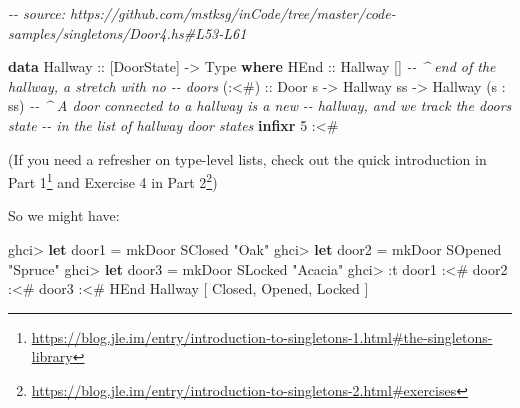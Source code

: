 \documentclass[]{article}
\newenvironment{Shaded}{}{}
\newcommand{\CommentTok}[1]{\textcolor[rgb]{0.38,0.63,0.69}{\textit{#1}}}
\newcommand{\DataTypeTok}[1]{\textcolor[rgb]{0.56,0.13,0.00}{#1}}
\newcommand{\DecValTok}[1]{\textcolor[rgb]{0.25,0.63,0.44}{#1}}
\newcommand{\KeywordTok}[1]{\textcolor[rgb]{0.00,0.44,0.13}{\textbf{#1}}}
\newcommand{\NormalTok}[1]{#1}
\newcommand{\OperatorTok}[1]{\textcolor[rgb]{0.40,0.40,0.40}{#1}}
\newcommand{\OtherTok}[1]{\textcolor[rgb]{0.00,0.44,0.13}{#1}}
\newcommand{\StringTok}[1]{\textcolor[rgb]{0.25,0.44,0.63}{#1}}
\renewcommand{\href}[2]{#2\footnote{\url{#1}}}
\begin{document}
\begin{Shaded}
\begin{Highlighting}[]
\CommentTok{{-}{-} source: https://github.com/mstksg/inCode/tree/master/code{-}samples/singletons/Door4.hs\#L53{-}L61}

\KeywordTok{data} \DataTypeTok{Hallway}\OtherTok{ ::}\NormalTok{ [}\DataTypeTok{DoorState}\NormalTok{] }\OtherTok{{-}\textgreater{}} \DataTypeTok{Type} \KeywordTok{where}
    \DataTypeTok{HEnd}\OtherTok{  ::} \DataTypeTok{Hallway}\NormalTok{ \textquotesingle{}[]        }\CommentTok{{-}{-} \^{} end of the hallway, a stretch with no}
                                \CommentTok{{-}{-}   doors}
\OtherTok{    (:\textless{}\#) ::} \DataTypeTok{Door}\NormalTok{ s}
          \OtherTok{{-}\textgreater{}} \DataTypeTok{Hallway}\NormalTok{ ss}
          \OtherTok{{-}\textgreater{}} \DataTypeTok{Hallway}\NormalTok{ (s \textquotesingle{}}\OperatorTok{:}\NormalTok{ ss)  }\CommentTok{{-}{-} \^{} A door connected to a hallway is a new}
                                \CommentTok{{-}{-}   hallway, and we track the door\textquotesingle{}s state}
                                \CommentTok{{-}{-}   in the list of hallway door states}
\KeywordTok{infixr} \DecValTok{5} \OperatorTok{:\textless{}\#}
\end{Highlighting}
\end{Shaded}

(If you need a refresher on type-level lists, check out
\href{https://blog.jle.im/entry/introduction-to-singletons-1.html\#the-singletons-library}{the
quick introduction in Part 1} and
\href{https://blog.jle.im/entry/introduction-to-singletons-2.html\#exercises}{Exercise
4 in Part 2})

So we might have:

\begin{Shaded}
\begin{Highlighting}[]
\NormalTok{ghci}\OperatorTok{\textgreater{}} \KeywordTok{let}\NormalTok{ door1 }\OtherTok{=}\NormalTok{ mkDoor }\DataTypeTok{SClosed} \StringTok{"Oak"}
\NormalTok{ghci}\OperatorTok{\textgreater{}} \KeywordTok{let}\NormalTok{ door2 }\OtherTok{=}\NormalTok{ mkDoor }\DataTypeTok{SOpened} \StringTok{"Spruce"}
\NormalTok{ghci}\OperatorTok{\textgreater{}} \KeywordTok{let}\NormalTok{ door3 }\OtherTok{=}\NormalTok{ mkDoor }\DataTypeTok{SLocked} \StringTok{"Acacia"}
\NormalTok{ghci}\OperatorTok{\textgreater{}} \OperatorTok{:}\NormalTok{t door1 }\OperatorTok{:\textless{}\#}\NormalTok{ door2 }\OperatorTok{:\textless{}\#}\NormalTok{ door3 }\OperatorTok{:\textless{}\#} \DataTypeTok{HEnd}
\DataTypeTok{Hallway}\NormalTok{ \textquotesingle{}[ }\DataTypeTok{\textquotesingle{}Closed}\NormalTok{, }\DataTypeTok{\textquotesingle{}Opened}\NormalTok{, }\DataTypeTok{\textquotesingle{}Locked}\NormalTok{ ]}
\end{Highlighting}
\end{Shaded}
\end{document}
